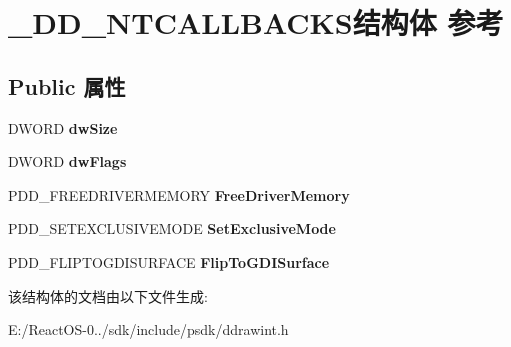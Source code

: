 \hypertarget{struct___d_d___n_t_c_a_l_l_b_a_c_k_s}{}\section{\+\_\+\+D\+D\+\_\+\+N\+T\+C\+A\+L\+L\+B\+A\+C\+K\+S结构体 参考}
\label{struct___d_d___n_t_c_a_l_l_b_a_c_k_s}
\subsection*{Public 属性}
\begin{DoxyCompactItemize}
\item 
\mbox{\label{struct___d_d___n_t_c_a_l_l_b_a_c_k_s_acf637058ffa7b0eab7959325d8d813e6}} 
D\+W\+O\+RD {\bfseries dw\+Size}
\item 
\mbox{\label{struct___d_d___n_t_c_a_l_l_b_a_c_k_s_a43a243f8a2ea44dd51edb27c57f1ecad}} 
D\+W\+O\+RD {\bfseries dw\+Flags}
\item 
\mbox{\label{struct___d_d___n_t_c_a_l_l_b_a_c_k_s_a2959409e09a20e75e4019cad3ecd3a7c}} 
P\+D\+D\+\_\+\+F\+R\+E\+E\+D\+R\+I\+V\+E\+R\+M\+E\+M\+O\+RY {\bfseries Free\+Driver\+Memory}
\item 
\mbox{\label{struct___d_d___n_t_c_a_l_l_b_a_c_k_s_a9c8ef24dd3f4f34005a651be3f7f7422}} 
P\+D\+D\+\_\+\+S\+E\+T\+E\+X\+C\+L\+U\+S\+I\+V\+E\+M\+O\+DE {\bfseries Set\+Exclusive\+Mode}
\item 
\mbox{\label{struct___d_d___n_t_c_a_l_l_b_a_c_k_s_af9022f05d1029ed948e52325fc9cc15d}} 
P\+D\+D\+\_\+\+F\+L\+I\+P\+T\+O\+G\+D\+I\+S\+U\+R\+F\+A\+CE {\bfseries Flip\+To\+G\+D\+I\+Surface}
\end{DoxyCompactItemize}


该结构体的文档由以下文件生成\+:\begin{DoxyCompactItemize}
\item 
E\+:/\+React\+O\+S-\/0../sdk/include/psdk/ddrawint.\+h\end{DoxyCompactItemize}
